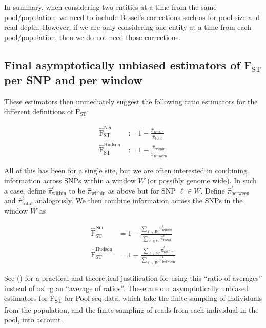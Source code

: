 \documentclass[letterpaper,fontsize=9pt,DIV=12]{scrartcl}
\newcommand\citeay[1]{\citeauthor{#1} (\citeyear{#1}) \cite{#1}}
\newcommand{\fst}{F\textsubscript{ST}}
\begin{document}
In summary, when considering two entities at a time from the same pool/population, we need to include Bessel's corrections such as for pool size and read depth. However, if we are only considering one entity at a time from each pool/population, then we do not need those corrections.


\subsection{Final asymptotically unbiased estimators of \texorpdfstring{$\text{F}_\text{ST}$}{FST} per SNP and per window}
\label{supp:sec:FST:sub:EstimatorFST}

These estimators then immediately suggest the following ratio estimators for the different definitions of $\text{F}_\text{ST}$:

\begin{align}
    \widehat{\text{F}}_\text{ST}^\text{Nei} &:= 1 - \frac{\widehat{\pi}_\text{within}}{\widehat{\pi}_\text{total}}\\
    \widehat{\text{F}}_\text{ST}^\text{Hudson} &:= 1 - \frac{\widehat{\pi}_\text{within}}{\widehat{\pi}_\text{between}}
\end{align}

All of this has been for a single site, but we are often interested in combining information across SNPs within a window $W$ (or possibly genome wide).
In such a case, define $\widehat{\pi}^\ell_\text{within}$ to be $\widehat{\pi}_\text{within}$ as above but for SNP $\ell \in W$.
Define $\widehat{\pi}^\ell_\text{between}$ and $\widehat{\pi}^\ell_\text{total}$ analogously.
We then combine information across the SNPs in the window $W$ as

\begin{align}
    \widehat{\text{F}}_\text{ST}^\text{Nei}    &= 1 - \frac{\sum_{\ell \in W} \widehat{\pi}^\ell_\text{within}} {\sum_{\ell \in W} \widehat{\pi}^\ell_\text{total}} \\
    \widehat{\text{F}}_\text{ST}^\text{Hudson} &= 1 - \frac{\sum_{\ell \in W} \widehat{\pi}^\ell_\text{within}} {\sum_{\ell \in W} \widehat{\pi}^\ell_\text{between}}
\end{align}

See \citeay{Bhatia2013} for a practical and theoretical justification for using this ``ratio of averages'' instead of using an ``average of ratios''.
These are our asymptotically unbiased estimators for \fst{} for Pool-seq data, which take the finite sampling of individuals from the population, and the finite sampling of reads from each individual in the pool, into account.
\end{document}

